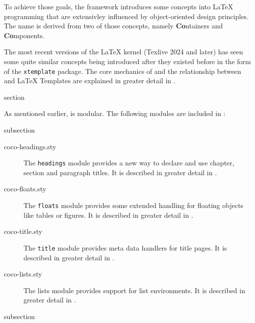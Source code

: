 To achieve those goals, the framework introduces some concepts into
{\LaTeX} programming that are extensivley influenced by
object-oriented design principles. The name {\CoCoTeX} is derived from
two of those concepts, namely \textbf{Co}ntainers and
\textbf{Co}mponents.

The most recent versions of the {\LaTeX} kernel (Texlive 2024 and
later) has seen some quite similar concepts being introduced after
they existed before in the form of the \lstinline{xtemplate}
package. The core mechanics of {\CoCoTeX} and the relationship between
{\CoCoTeX} and {\LaTeX} Templates are explained in greater detail in
.


\begin{Heading}{section}
\end{Heading}

As mentioned earlier, {\CoCoTeX} is modular. The following modules are
included in {\CoCoTeX}:


\begin{Heading}{subsection}
\end{Heading}

\begin{description}
\item[\ttfamily coco-headings.sty] The \lstinline{headings}
  module provides a new way to declare and
  use chapter, section and paragraph titles. It is described in
  greater detail in .
\item[\ttfamily coco-floats.sty] The \lstinline{floats}
  module provides some extended handling for
  floating objects like tables or figures. It is described in greater
  detail in .
\item[\ttfamily coco-title.sty] The
  \lstinline{title} module provides meta data
  handlers for title pages. It is described in greater detail in
  .
\item[\ttfamily coco-lists.sty] The lists
  module provides support for list
  environments. It is described in greater detail in
  .
\end{description}


\begin{Heading}{subsection}
\end{Heading}

